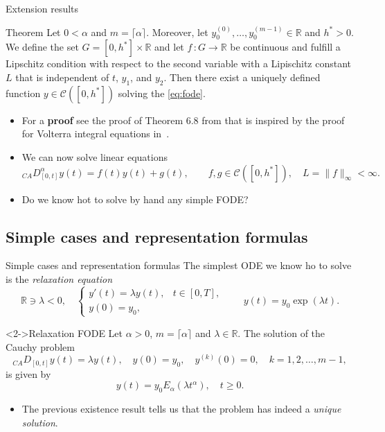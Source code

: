 \documentclass[aspectratio=169,xcolor=dvipsnames]{beamer}
\begin{document}
\begin{frame}{Extension results}

\begin{alertblock}{Theorem}
Let $0 < \alpha$ and $m = \lceil \alpha \rceil$. Moreover, let $y_0^{(0)},\ldots,y_0^{(m-1)} \in \mathbb{R}$ and $h^* > 0$. We define the set $G = [0,h^*] \times \mathbb{R}$ and let $f\,:G \rightarrow \mathbb{R}$ be continuous and fulfill a Lipschitz condition with respect to the second variable with a Lipischitz constant $L$ that is independent of $t$, $y_1$, and $y_2$. Then there exist a uniquely defined function $y \in \mathcal{C}([0,h^*])$ solving the \eqref{eq:fode}.
\end{alertblock}

\begin{itemize}
	\item[\faBook] For a \textbf{proof} see the proof of Theorem 6.8 from \parencite[pp 96-102]{DiethelmBook} that is inspired by the proof for Volterra integral equations in~\parencite[Theorem 4.8]{MR796318}.
	\item[{\faSmile[regular]}] We can now solve \alert{linear equations} 
	\[
	{}_{CA}D_{[0,t]}^\alpha y(t) = f(t)y(t) + g(t), \qquad f,g \in \mathcal{C}([0,h^*]), \quad L = \|f\|_{\infty} < \infty.
	\]
	\item<2>[\faQuestionCircle] Do we know hot to solve by hand any simple FODE? 
\end{itemize}

\end{frame}

\subsection{Simple cases and representation formulas}

\begin{frame}{Simple cases and representation formulas}
The simplest ODE we know ho to solve is the \emph{relaxation equation}
\[
\mathbb{R} \ni \lambda < 0, \quad \begin{cases}
y'(t) = \lambda y(t), & t \in [0,T],\\
y(0) = y_0,
\end{cases} \qquad y(t) = y_0 \exp(\lambda t).
\]
\begin{exampleblock}<2->{Relaxation FODE}
Let $\alpha > 0$, $m = \lceil \alpha \rceil$ and $\lambda \in \mathbb{R}$. The solution of the Cauchy problem
\[ {}_{CA}D_{[0,t]}y(t) = \lambda y(t), \quad y(0) = y_0, \quad y^{(k)}(0) = 0, \quad k=1,2,\ldots,m-1, \]
is given by
\[
y(t) = y_0 E_\alpha(\lambda t^\alpha), \quad t \geq 0.
\]
\end{exampleblock}
\begin{itemize}
	\item<3> The previous existence result tells us that the problem has indeed a \emph{unique solution}.
\end{itemize}
\end{frame}
\end{document}
